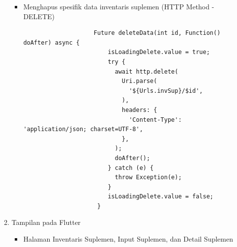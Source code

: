 \begin{spacing}{1.5}
\begin{enumerate}
\begin{enumerate}
\begin{itemize}
				\item Menghapus spesifik data inventaris suplemen (HTTP Method - DELETE)
				
				\begin{lstlisting}
					Future deleteData(int id, Function() doAfter) async {
						isLoadingDelete.value = true;
						try {
						  await http.delete(
							Uri.parse(
							  '${Urls.invSup}/$id',
							),
							headers: {
							  'Content-Type': 'application/json; charset=UTF-8',
							},
						  );
						  doAfter();
						} catch (e) {
						  throw Exception(e);
						}
						isLoadingDelete.value = false;
					 }
				\end{lstlisting}
			\end{itemize}

			\item Tampilan pada Flutter
			
			\begin{itemize}
				\item Halaman Inventaris Suplemen, Input Suplemen, dan Detail Suplemen
				

\end{itemize}
\end{enumerate}
\end{enumerate}
\end{spacing}
